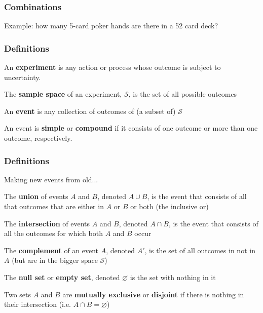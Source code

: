 \begin{frame}
\frametitle{Combinations}

Example: how many 5-card poker hands are there in a 52 card deck?

\end{frame}

\begin{frame}
\frametitle{Definitions}

An \textbf{experiment} is any action or process whose outcome is subject to uncertainty.
\newline

The \textbf{sample space} of an experiment, $\mathcal{S}$, is the set of all possible outcomes
\newline

An \textbf{event} is any collection of outcomes of (a subset of) $\mathcal{S}$ 
\newline

An event is \textbf{simple} or \textbf{compound} if it consists of one outcome or more than one outcome, respectively.
\newline

\end{frame}

\begin{frame}
\frametitle{Definitions}

Making new events from old...
\newline

The \textbf{union} of events $A$ and $B$, denoted $A \cup B$, is the event that consists of all that outcomes that are either in $A$ or $B$ or both (the inclusive or)
\newline

The \textbf{intersection} of events $A$ and $B$, denoted $A \cap B$, is the event that consists of all the outcomes for which both $A$ and $B$ occur
\newline

The \textbf{complement} of an event $A$, denoted $A'$, is the set of all outcomes in not in $A$ (but are in the bigger space $\mathcal{S}$) 
\newline

The \textbf{null set} or \textbf{empty set}, denoted $\varnothing$ is the set with nothing in it 
\newline

Two sets $A$ and $B$ are \textbf{mutually exclusive} or \textbf{disjoint} if there is nothing in their intersection (i.e. $A \cap B = \varnothing$)


\end{frame}

